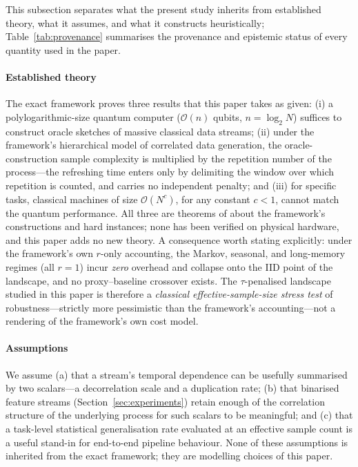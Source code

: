\documentclass[sensors,article,submit,pdftex,moreauthors]{Definitions/mdpi}
\newcommand{\bigO}{\mathcal{O}}
\providecommand{\DIFadd}[1]{{\protect\color{blue}#1}} %
\begin{document}
\DIFadd{This subsection separates what the present study inherits from established theory, what it assumes, and what it constructs heuristically; Table~\ref{tab:provenance} summarises the provenance and epistemic status of every quantity used in the paper.
}

\paragraph{\DIFadd{Established theory}} \DIFadd{The exact framework }\citep{zhao2026exponential} \DIFadd{proves three results that this paper takes as given: (i) a polylogarithmic-size quantum computer ($\bigO(n)$ qubits, $n = \log_2 N$) suffices to construct oracle sketches of massive classical data streams; (ii) under the framework's hierarchical model of correlated data generation, the oracle-construction sample complexity is multiplied by the repetition number of the process---the refreshing time enters only by delimiting the window over which repetition is counted, and carries no independent penalty; and (iii) for specific tasks, classical machines of size $\bigO(N^{c})$, for any constant $c < 1$, cannot match the quantum performance. All three are theorems of }\citet{zhao2026exponential} \DIFadd{about the framework's constructions and hard instances; none has been verified on physical hardware, and this paper adds no new theory. A consequence worth stating explicitly: under the framework's own $r$-only accounting, the Markov, seasonal, and long-memory regimes (all $r = 1$) incur }\emph{\DIFadd{zero}} \DIFadd{overhead and collapse onto the IID point of the landscape, and no proxy--baseline crossover exists. The $\tau$-penalised landscape studied in this paper is therefore a }\emph{\DIFadd{classical effective-sample-size stress test}} \DIFadd{of robustness---strictly more pessimistic than the framework's accounting---not a rendering of the framework's own cost model.
}

\paragraph{\DIFadd{Assumptions}} \DIFadd{We assume (a) that a stream's temporal dependence can be usefully summarised by two scalars---a decorrelation scale and a duplication rate; (b) that binarised feature streams (Section~\ref{sec:experiments}) retain enough of the correlation structure of the underlying process for such scalars to be meaningful; and (c) that a task-level statistical generalisation rate evaluated at an effective sample count is a useful stand-in for end-to-end pipeline behaviour. None of these assumptions is inherited from the exact framework; they are modelling choices of this paper.
}
\end{document}
